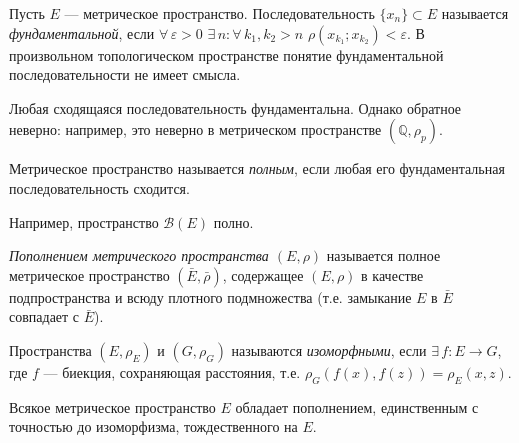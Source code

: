 \documentclass[10pt,titlepage, a4paper]{article}
\begin{document}
\begin{defen}
Пусть $E$ --- метрическое пространство. Последовательность
$\{x_n\}\subset E$ называется \emph{фундаментальной}, если
$\forall\,\varepsilon>0$ $\exists\,n:\forall\,k_1,k_2>n$
$\rho(x_{k_1};x_{k_2})<\varepsilon$. В произвольном топологическом
пространстве понятие фундаментальной последовательности не имеет
смысла.
\end{defen}

\begin{zam}
Любая сходящаяся последовательность фундаментальна. Однако обратное
неверно: например, это неверно в метрическом пространстве
$(\mathbb{Q},\rho_p)$.
\end{zam}

\begin{defen}
Метрическое пространство называется \emph{полным}, если любая его
фундаментальная последовательность сходится.

Например, пространство $\mathcal{B}(E)$ полно.
\end{defen}

\begin{defen}
\emph{Пополнением метрического пространства $(E,\rho)$} называется
полное метрическое пространство $(\bar{E},\bar{\rho})$, содержащее
$(E,\rho)$ в качестве подпространства и всюду плотного подмножества
(т.е. замыкание $E$ в $\bar{E}$ совпадает с $\bar{E}$).
\end{defen}

\begin{defen}
Пространства $(E,\rho_E)$ и $(G,\rho_G)$ называются
\emph{изоморфными}, если $\exists\,f\colon E\to G$, где $f$ ---
биекция, сохраняющая расстояния, т.е.
$\rho_G(f(x),f(z))=\rho_E(x,z)$.
\end{defen}

\lecture

\begin{theorem}
Всякое метрическое пространство $E$ обладает пополнением,
единственным с точностью до изоморфизма, тождественного на $E$.
\end{theorem}
\end{document}
